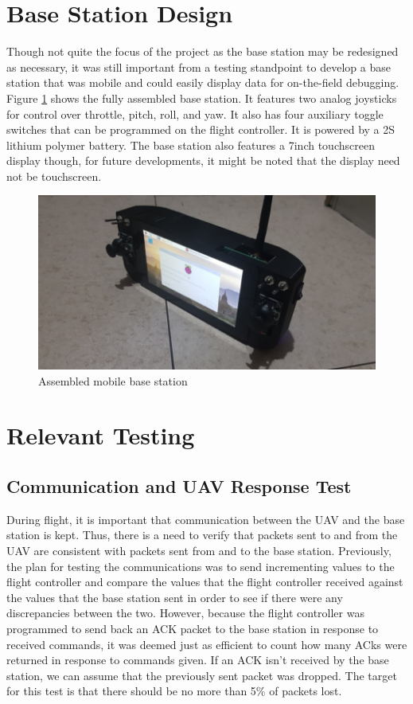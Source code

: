 \documentclass[english]{upeeei}
\begin{document}
\section{Base Station Design}
Though not quite the focus of the project as the base station may be redesigned as necessary, it was still important from a testing
standpoint to develop a base station that was mobile and could easily display data for on-the-field debugging. Figure \ref{fig:diosa_base_station}
shows the fully assembled base station. It features two analog joysticks for control over throttle, pitch, roll, and yaw. It also has four auxiliary
toggle switches that can be programmed on the flight controller. It is powered by a 2S lithium polymer battery. The base station also features
a 7inch touchscreen display though, for future developments, it might be noted that the display need not be touchscreen.

\begin{figure}[h]
    \centering
    \includegraphics[scale=0.6]{images/diosa_base_station.PNG}
    \caption{Assembled mobile base station}
    \label{fig:diosa_base_station}
\end{figure}

\section{Relevant Testing}
\subsection{Communication and UAV Response Test}
During flight, it is important that communication between the UAV and the base station is kept. Thus, there is a need to verify that
packets sent to and from the UAV are consistent with packets sent from and to the base station.
Previously, the plan for testing the communications was to send incrementing values to the flight controller and compare the values
that the flight controller received against the values that the base station sent in order to see if there were any discrepancies
between the two. However, because the flight controller was programmed to send back an ACK packet to the base station in response to
received commands, it was deemed just as efficient to count how many ACks were returned in response to commands given. If an ACK isn't
received by the base station, we can assume that the previously sent packet was dropped. The target for this test is that there should
be no more than 5\% of packets lost.
\end{document}
